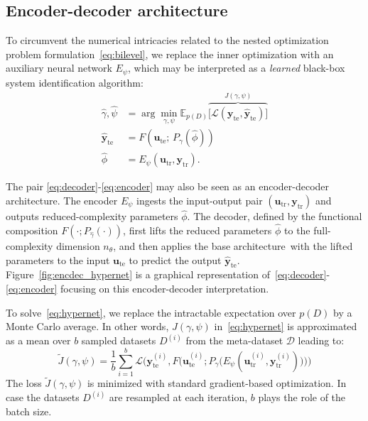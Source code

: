 \documentclass{article}
\newcommand{\base}{{base architecture}}
\newcommand{\ii}{{(i)}}
\newcommand{\tr}{\mathrm{tr}}
\newcommand{\te}{\mathrm{te}}
\newcommand{\seq}[1]{{\mathbf{#1}}}
\newcommand{\E}{\mathbb{E}}
\newcommand{\DD}{\mathcal{D}}
\newcommand{\loss}{\mathcal{L}}
\newcommand{\fullpar}{\theta}
\newcommand{\redpar}{\phi}
\newcommand{\projpar}{\gamma}
\newcommand{\encpar}{\psi}
\newcommand{\M}{F}
\begin{document}
\subsection{Encoder-decoder architecture}
\label{enc_dec_hypernet}
To circumvent the numerical intricacies related to the nested optimization problem formulation~\eqref{eq:bilevel}, we replace the inner optimization with an auxiliary neural network $E_{\encpar}$, which may be interpreted as a \emph{learned} black-box system identification algorithm:
\begin{subequations}
\label{eq:hypernet}
\begin{align}
\hat \projpar, \hat \encpar &= \arg \min_{\projpar, \encpar} \E_{p(D)}
\overbrace{\big [ \loss({\seq y}_\te, \hat {\seq y}_\te) \big ]}^{J(\projpar, \encpar)} \label{eq:hypernet_a}\\
\hat{\seq{y}}_\te  &= \M\left(
  \seq{u}_\te ; \,
  P_{\projpar} ( \hat \redpar )
\right) \label{eq:decoder}\\
  \hat \redpar &=
  E_{\encpar}(\seq u_\tr , \seq y_\tr ) \label{eq:encoder}.
\end{align}
\end{subequations}

The pair \eqref{eq:decoder}-\eqref{eq:encoder} may also be seen as an encoder-decoder architecture. The encoder $E_\encpar$ ingests the input-output pair $(\seq u_\tr , \seq y_\tr )$ and outputs reduced-complexity parameters $\hat \redpar$. The decoder, defined by the functional composition $\M(\cdot; P_{\hat \projpar}(\cdot))$, first lifts the reduced parameters  $\hat \redpar$ to the full-complexity dimension $n_\fullpar$, and then applies the \base\ with the lifted parameters to the input $\seq u_\te $ to predict the output $\hat {\seq y}_\te $. Figure~\ref{fig:encdec_hypernet} is a graphical representation of~\eqref{eq:decoder}-\eqref{eq:encoder}
focusing on this encoder-decoder interpretation.

To solve~\eqref{eq:hypernet}, we replace the intractable expectation over $p(D)$
by a Monte Carlo average. In other words, $J(\projpar, \encpar)$ in~\eqref{eq:hypernet} is approximated as a mean  over $b$ sampled datasets $D^\ii$ from the meta-dataset $\DD$ leading to:
\begin{equation}
    \label{eq:monte_carlo}
    \tilde J(\projpar, \encpar) = \frac{1}{b} \sum_{i=1}^b \loss\bigg(\seq y_\te^\ii, \M\Big(\seq u_\te^\ii; P_\projpar\big(E_\encpar(\seq u_\tr^\ii, \seq y_\tr^\ii)\big)\Big)\bigg)
\end{equation}
The loss $ \tilde J(\projpar, \encpar)$ is minimized with standard gradient-based optimization. In case the datasets $D^\ii$ are resampled at each iteration, $b$ plays the role of the batch size.
\end{document}
